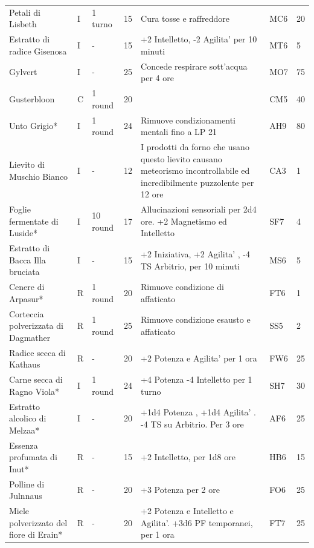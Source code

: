 \documentclass[a4paper,11pt,twoside,openany]{book}
\begin{document}
{\begin{longtable}{|L{3.2cm} |k{0.7cm} |k{1.7cm}| D{1cm} |L{5cm} |k{1.5cm} |k{1cm}|}
Petali di Lisbeth  & I & 1 turno & 15 & Cura tosse e raffreddore & MC6 & 20\\
Estratto di radice Gisenosa & I & - & 15 & +2 Intelletto, -2 Agilita' per 10 minuti & MT6 & 5\\
Gylvert& I & - & 25 & Concede respirare sott'acqua per 4 ore & MO7 & 75\\
Gusterbloon  & C & 1 round & 20 & & CM5 & 40\\
Unto Grigio{*}  & I & 1 round & 24 & Rimuove condizionamenti mentali fino a LP 21 & AH9 & 80\\
Lievito di Muschio Bianco & I & - & 12 & I prodotti da forno che usano questo lievito causano meteorismo incontrollabile ed incredibilmente puzzolente per 12 ore & CA3 & 1\\
Foglie fermentate di Luside*& I & 10 round & 17 & Allucinazioni sensoriali per 2d4 ore. +2 Magnetismo ed Intelletto & SF7 & 4\\
Estratto di Bacca Illa bruciata& I & - & 15 & +2 Iniziativa, +2 Agilita' , -4 TS Arbitrio, per 10 minuti& MS6 & 5\\
Cenere di Arpasur{*}  & R & 1 round & 20 & Rimuove condizione di affaticato & FT6 & 1\\
Corteccia polverizzata di Dagmather& R & 1 round & 25 & Rimuove condizione esausto e affaticato & SS5 & 2\\
Radice secca di Kathaus & R & - & 20 & +2 Potenza e Agilita' per 1 ora & FW6 & 25\\
Carne secca di Ragno Viola*  & I & 1 round & 24 & +4 Potenza -4 Intelletto per 1 turno & SH7 & 30\\
Estratto alcolico di Melzaa*& I & - & 20 & +1d4 Potenza , +1d4 Agilita' . -4 TS su Arbitrio. Per 3 ore& AF6 & 25\\
Essenza profumata di Inut* & R & - & 15 & +2 Intelletto, per 1d8 ore & HB6 & 15\\
Polline di Julnnaus & R & - & 20 & +3 Potenza per 2 ore & FO6 & 25\\
Miele polverizzato del fiore di Erain* & R & - & 20 & +2 Potenza e Intelletto e Agilita'. +3d6 PF temporanei, per 1 ora& FT7 & 25 \\
\end{longtable}

}
\end{document}
